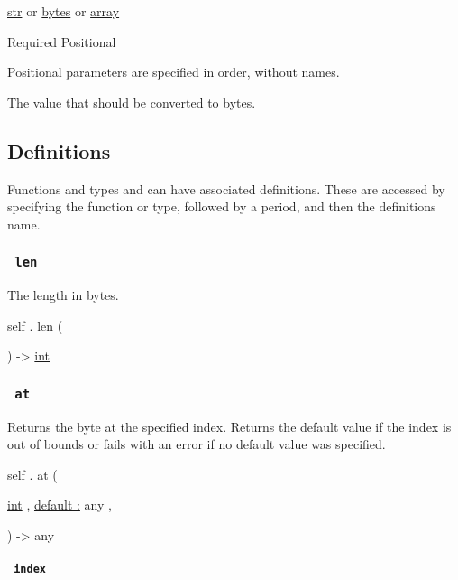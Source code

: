 \href{/docs/reference/foundations/str/}{str} {or}
\href{/docs/reference/foundations/bytes/}{bytes} {or}
\href{/docs/reference/foundations/array/}{array}

{Required} {{ Positional }}

\label{constructor-value-positional-tooltip}
Positional parameters are specified in order, without names.

The value that should be converted to bytes.

\subsection{\texorpdfstring{{ Definitions
}}{ Definitions }}\label{definitions}

\label{definitions-tooltip}
Functions and types and can have associated definitions. These are
accessed by specifying the function or type, followed by a period, and
then the definition\textquotesingle s name.

\subsubsection{\texorpdfstring{\texttt{\ len\ }}{ len }}\label{definitions-len}

The length in bytes.

self { . } { len } (

) -\textgreater{} \href{/docs/reference/foundations/int/}{int}

\subsubsection{\texorpdfstring{\texttt{\ at\ }}{ at }}\label{definitions-at}

Returns the byte at the specified index. Returns the default value if
the index is out of bounds or fails with an error if no default value
was specified.

self { . } { at } (

{ \href{/docs/reference/foundations/int/}{int} , } {
\hyperref[definitions-at-parameters-default]{default :} { any } , }

) -\textgreater{} { any }

\paragraph{\texorpdfstring{\texttt{\ index\ }}{ index }}\label{definitions-at-index}

